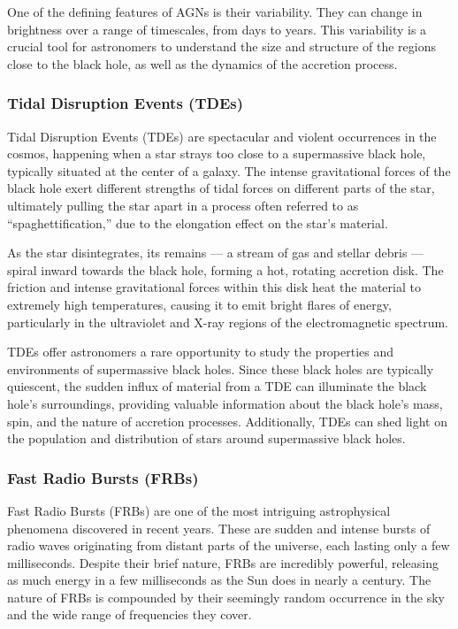 One of the defining features of AGNs is their variability. They can change in brightness over a range of timescales, from days to years. This variability is a crucial tool for astronomers to understand the size and structure of the regions close to the black hole, as well as the dynamics of the accretion process.

\subsubsection{Tidal Disruption Events (TDEs)} 

Tidal Disruption Events (TDEs) are spectacular and violent occurrences in the cosmos, happening when a star strays too close to a supermassive black hole, typically situated at the center of a galaxy. The intense gravitational forces of the black hole exert different strengths of tidal forces on different parts of the star, ultimately pulling the star apart in a process often referred to as ``spaghettification,'' due to the elongation effect on the star's material.

As the star disintegrates, its remains — a stream of gas and stellar debris — spiral inward towards the black hole, forming a hot, rotating accretion disk. The friction and intense gravitational forces within this disk heat the material to extremely high temperatures, causing it to emit bright flares of energy, particularly in the ultraviolet and X-ray regions of the electromagnetic spectrum.

TDEs offer astronomers a rare opportunity to study the properties and environments of supermassive black holes. Since these black holes are typically quiescent, the sudden influx of material from a TDE can illuminate the black hole’s surroundings, providing valuable information about the black hole's mass, spin, and the nature of accretion processes. Additionally, TDEs can shed light on the population and distribution of stars around supermassive black holes.

\subsubsection{Fast Radio Bursts (FRBs)}
Fast Radio Bursts (FRBs) are one of the most intriguing astrophysical phenomena discovered in recent years. These are sudden and intense bursts of radio waves originating from distant parts of the universe, each lasting only a few milliseconds. Despite their brief nature, FRBs are incredibly powerful, releasing as much energy in a few milliseconds as the Sun does in nearly a century. The nature of FRBs is compounded by their seemingly random occurrence in the sky and the wide range of frequencies they cover.

